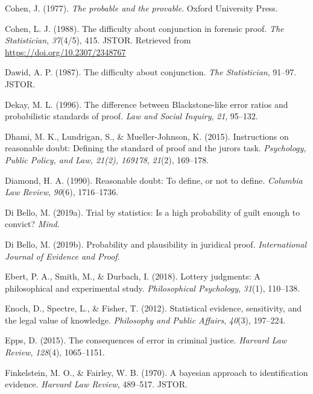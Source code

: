 \documentclass[10pt,dvipsnames,enabledeprecatedfontcommands]{scrartcl}
\begin{document}
\leavevmode\hypertarget{ref-Cohen1977The-probable-an}{}%
Cohen, J. (1977). \emph{The probable and the provable}. Oxford
University Press.

\leavevmode\hypertarget{ref-cohen1988difficulty}{}%
Cohen, L. J. (1988). The difficulty about conjunction in forensic proof.
\emph{The Statistician}, \emph{37}(4/5), 415. JSTOR. Retrieved from
\url{https://doi.org/10.2307/2348767}

\leavevmode\hypertarget{ref-dawid1987difficulty}{}%
Dawid, A. P. (1987). The difficulty about conjunction. \emph{The
Statistician}, 91--97. JSTOR.

\leavevmode\hypertarget{ref-Dekay1996}{}%
Dekay, M. L. (1996). The difference between Blackstone-like error ratios
and probabilistic standards of proof. \emph{Law and Social Inquiry},
\emph{21}, 95--132.

\leavevmode\hypertarget{ref-dhamiEtAl2015}{}%
Dhami, M. K., Lundrigan, S., \& Mueller-Johnson, K. (2015). Instructions
on reasonable doubt: Defining the standard of proof and the jurors task.
\emph{Psychology, Public Policy, and Law, 21(2), 169178}, \emph{21}(2),
169--178.

\leavevmode\hypertarget{ref-diamond90}{}%
Diamond, H. A. (1990). Reasonable doubt: To define, or not to define.
\emph{Columbia Law Review}, \emph{90}(6), 1716--1736.

\leavevmode\hypertarget{ref-diBello2019}{}%
Di Bello, M. (2019a). Trial by statistics: Is a high probability of
guilt enough to convict? \emph{Mind}.

\leavevmode\hypertarget{ref-DiBello2019plausibility}{}%
Di Bello, M. (2019b). Probability and plausibility in juridical proof.
\emph{International Journal of Evidence and Proof}.

\leavevmode\hypertarget{ref-ebert2018}{}%
Ebert, P. A., Smith, M., \& Durbach, I. (2018). Lottery judgments: A
philosophical and experimental study. \emph{Philosophical Psychology},
\emph{31}(1), 110--138.

\leavevmode\hypertarget{ref-Enoch2012Statistical}{}%
Enoch, D., Spectre, L., \& Fisher, T. (2012). Statistical evidence,
sensitivity, and the legal value of knowledge. \emph{Philosophy and
Public Affairs}, \emph{40}(3), 197--224.

\leavevmode\hypertarget{ref-epps2015}{}%
Epps, D. (2015). The consequences of error in criminal justice.
\emph{Harvard Law Review}, \emph{128}(4), 1065--1151.

\leavevmode\hypertarget{ref-finkelstein1970bayesian}{}%
Finkelstein, M. O., \& Fairley, W. B. (1970). A bayesian approach to
identification evidence. \emph{Harvard Law Review}, 489--517. JSTOR.
\end{document}
